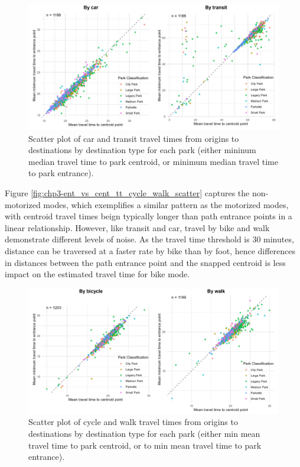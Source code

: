 \documentclass[
11pt, %
oneside, %
english, %
singlespacing, %
]{macthesis} %
\begin{document}
\begin{figure}

{\centering \includegraphics[width=6in]{./data/figures/chp3-ent_vs_cent_tt_transit_car_scatter} 

}

\caption{\label{fig:chp3-ent_vs_cent_tt_car_transit_scatter} Scatter plot of car and transit travel times from origins to destinations by destination type for each park (either mininum median travel time to park centroid, or minimum median travel time to park entrance). }\label{fig:unnamed-chunk-47}
\end{figure}

Figure \ref{fig:chp3-ent_vs_cent_tt_cycle_walk_scatter} captures the non-motorized modes, which exemplifies a similar pattern as the motorized modes, with centroid travel times beign typically longer than path entrance points in a linear relationship. However, like transit and car, travel by bike and walk demonstrate different levels of noise. As the travel time threshold is 30 minutes, distance can be traversed at a faster rate by bike than by foot, hence differences in distances between the path entrance point and the snapped centroid is less impact on the estimated travel time for bike mode.

\begin{figure}

{\centering \includegraphics[width=6in]{./data/figures/chp3-ent_vs_cent_tt_walk_cycle_scatter} 

}

\caption{\label{fig:chp3-ent_vs_cent_tt_cycle_walk_scatter}  Scatter plot of cycle and walk travel times from origins to destinations by destination type for each park (either min mean travel time to park centroid, or to min mean travel time to park entrance). }\label{fig:unnamed-chunk-48}
\end{figure}
\end{document}
